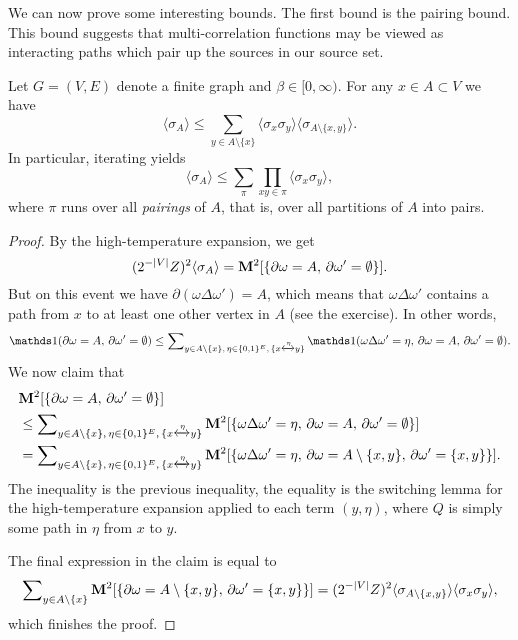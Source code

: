 We can now prove some interesting bounds.
The first bound is the pairing bound.
This bound suggests that multi-correlation functions may be viewed
as interacting paths which pair up the sources in our source set.

\begin{theorem}
    Let $G=(V,E)$ denote a finite graph and $\beta\in[0,\infty)$.
    For any $x\in A\subset V$ we have
    \begin{equation}
        \langle\sigma_A\rangle
        \leq
        \sum_{y\in A\setminus\{x\}}
        \langle\sigma_x\sigma_y\rangle
        \langle \sigma_{A\setminus\{x,y\}}\rangle.
    \end{equation}
    In particular, iterating yields
    \[
        \langle\sigma_A\rangle
        \leq
        \sum_{\pi}
        \prod_{xy\in\pi}
        \langle\sigma_x\sigma_y\rangle,
    \]
    where $\pi$ runs over all \emph{pairings} of $A$,
    that is, over all partitions of $A$ into pairs.
\end{theorem}

\begin{proof}
    By the high-temperature expansion,
    we get
    \[
        (2^{-|V|}Z)^2 \langle\sigma_A\rangle
        =
        \mathbf{M}^2[\{\partial\omega = A,\,\partial\omega'=\emptyset\}].
    \]
    But on this event we have $\partial(\omega\Delta\omega')=A$,
    which means that $\omega\Delta\omega'$ contains a path
    from $x$ to at least one other vertex in $A$ (see the exercise).
    In other words,
    \[
        \true{\partial\omega = A,\,\partial\omega'=\emptyset}
        \leq
        \sum\nolimits_{y\in A\setminus\{x\},\,\eta\in\{0,1\}^E,\,\{x\xleftrightarrow{\eta}y\}}
        \true{\omega\Delta\omega'=\eta,\,\partial\omega = A,\,\partial\omega'=\emptyset}.
    \]
    We now claim that
    \begin{align}
        &\mathbf{M}^2[\{\partial\omega = A,\,\partial\omega'=\emptyset\}]
        \\&\leq 
            \sum\nolimits_{y\in A\setminus\{x\},\,\eta\in\{0,1\}^E,\,\{x\xleftrightarrow{\eta}y\}}
        \mathbf{M}^2[
        \{\omega\Delta\omega'=\eta,\,\partial\omega = A,\,\partial\omega'=\emptyset\}
        ]
        \\&=
            \sum\nolimits_{y\in A\setminus\{x\},\,\eta\in\{0,1\}^E,\,\{x\xleftrightarrow{\eta}y\}}
        \mathbf{M}^2[
        \{\omega\Delta\omega'=\eta,\,\partial\omega = A\setminus\{x,y\},\,\partial\omega'=\{x,y\}\}
        ].
    \end{align}
    The inequality is the previous inequality,
    the equality is the switching lemma for the high-temperature expansion
    applied to each term $(y,\eta)$,
    where $Q$ is simply some path in $\eta$ from $x$ to $y$.

    The final expression in the claim is equal to
    \[
        \sum\nolimits_{y\in A\setminus\{x\}}
        \mathbf{M}^2[
        \{\partial\omega = A\setminus\{x,y\},\,\partial\omega'=\{x,y\}\}
        ]
        =
        (2^{-|V|}Z)^2 \langle\sigma_{A\setminus\{x,y\}}\rangle\langle\sigma_x\sigma_y\rangle,
    \]
    which finishes the proof.
\end{proof}

